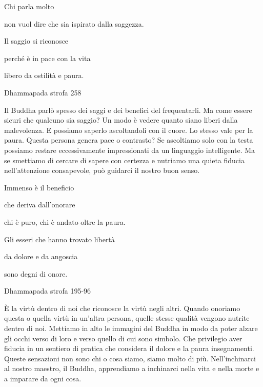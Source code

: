 \documentclass[a4paper,portrait,12pt]{article}
\begin{document}
\newpage



Chi parla molto


non vuol dire che sia ispirato dalla saggezza.


Il saggio si riconosce


perch\'{e} \`{e} in pace con la vita


libero da ostilit\`{a} e paura.





Dhammapada strofa 258


\newpage



Il Buddha parl\`{o} spesso dei saggi e dei benefici del frequentarli. Ma come essere sicuri che qualcuno sia saggio? Un modo \`{e} vedere quanto siano liberi dalla malevolenza. E possiamo saperlo ascoltandoli con il cuore. Lo stesso vale per la paura. Questa persona genera pace o contrasto? Se ascoltiamo solo con la testa possiamo restare eccessivamente impressionati da un linguaggio intelligente. Ma se smettiamo di cercare di sapere con certezza e nutriamo una quieta fiducia nell'attenzione consapevole, pu\`{o} guidarci il nostro buon senso.


\newpage



Immenso \`{e} il beneficio


che deriva dall'onorare	


chi \`{e} puro, chi \`{e} andato oltre la paura.


Gli esseri che hanno trovato libert\`{a}


da dolore e da angoscia


sono degni di onore.





Dhammapada strofa 195-96


\newpage



\`{E} la virtù dentro di noi che riconosce la virtù negli altri. Quando onoriamo questa o quella virtù in un'altra persona, quelle stesse qualit\`{a} vengono nutrite dentro di noi. Mettiamo in alto le immagini del Buddha in modo da poter alzare gli occhi verso di loro e verso quello di cui sono simbolo. Che privilegio aver fiducia in un sentiero di pratica che considera il dolore e la paura insegnamenti. Queste sensazioni non sono chi o cosa siamo, siamo molto di più. Nell'inchinarci al nostro maestro, il Buddha, apprendiamo a inchinarci nella vita e nella morte e a imparare da ogni cosa.
\end{document}

